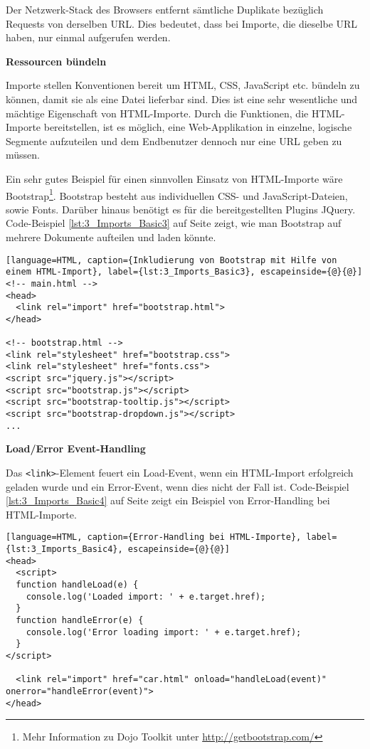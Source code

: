 Der Netzwerk-Stack des Browsers entfernt sämtliche Duplikate bezüglich Requests von derselben URL. Dies bedeutet, dass bei Importe, die dieselbe URL haben, nur einmal aufgerufen werden.

\textbf{Ressourcen bündeln}

Importe stellen Konventionen bereit um HTML, CSS, JavaScript etc. bündeln zu können, damit sie als eine Datei lieferbar sind. Dies ist eine sehr wesentliche und mächtige Eigenschaft von HTML-Importe. Durch die Funktionen, die HTML-Importe bereitstellen, ist es möglich, eine Web-Applikation in einzelne, logische Segmente aufzuteilen und dem Endbenutzer dennoch nur eine URL geben zu müssen.

Ein sehr gutes Beispiel für einen sinnvollen Einsatz von HTML-Importe wäre Bootstrap\footnote{Mehr Information zu Dojo Toolkit unter \href{http://getbootstrap.com/}{http://getbootstrap.com/}}. Bootstrap besteht aus individuellen CSS- und JavaScript-Dateien, sowie Fonts. Darüber hinaus benötigt es für die bereitgestellten Plugins JQuery. Code-Beispiel \ref{lst:3_Imports_Basic3} auf Seite \pageref{lst:3_Imports_Basic3} zeigt, wie man Bootstrap auf mehrere Dokumente aufteilen und laden könnte.

\begin{lstlisting}[language=HTML, caption={Inkludierung von Bootstrap mit Hilfe von einem HTML-Import}, label={lst:3_Imports_Basic3}, escapeinside={@}{@}]
<!-- main.html -->
<head>
  <link rel="import" href="bootstrap.html">
</head>

<!-- bootstrap.html -->
<link rel="stylesheet" href="bootstrap.css">
<link rel="stylesheet" href="fonts.css">
<script src="jquery.js"></script>
<script src="bootstrap.js"></script>
<script src="bootstrap-tooltip.js"></script>
<script src="bootstrap-dropdown.js"></script>
...
\end{lstlisting}

\textbf{Load/Error Event-Handling}

Das \lstinline|<link>|-Element feuert ein \glqq Load\grqq -Event, wenn ein HTML-Import erfolgreich geladen wurde und ein \glqq Error\grqq -Event, wenn dies nicht der Fall ist. Code-Beispiel \ref{lst:3_Imports_Basic4} auf Seite \pageref{lst:3_Imports_Basic4} zeigt ein Beispiel von Error-Handling bei HTML-Importe.

\begin{lstlisting}[language=HTML, caption={Error-Handling bei HTML-Importe}, label={lst:3_Imports_Basic4}, escapeinside={@}{@}]
<head>
  <script>
  function handleLoad(e) {
    console.log('Loaded import: ' + e.target.href);
  }
  function handleError(e) {
    console.log('Error loading import: ' + e.target.href);
  }
</script>

  <link rel="import" href="car.html" onload="handleLoad(event)" onerror="handleError(event)">
</head>
\end{lstlisting}

